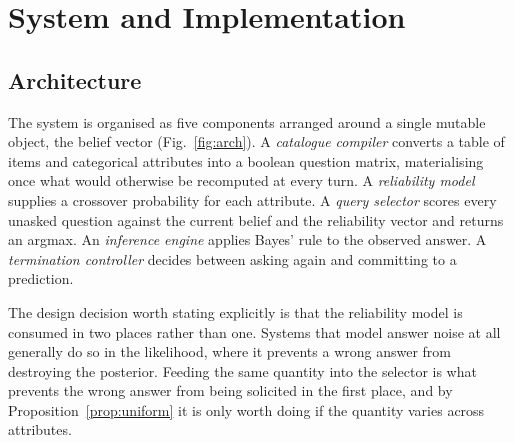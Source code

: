 \section{System and Implementation}
\label{sec:system}

\subsection{Architecture}

The system is organised as five components arranged around a single mutable
object, the belief vector (Fig.~\ref{fig:arch}). A \emph{catalogue compiler} converts a table of
items and categorical attributes into a boolean question matrix, materialising
once what would otherwise be recomputed at every turn. A \emph{reliability
model} supplies a crossover probability for each attribute. A \emph{query
selector} scores every unasked question against the current belief and the
reliability vector and returns an argmax. An \emph{inference engine} applies
Bayes' rule to the observed answer. A \emph{termination controller} decides
between asking again and committing to a prediction.

The design decision worth stating explicitly is that the reliability model is
consumed in two places rather than one. Systems that model answer noise at all
generally do so in the likelihood, where it prevents a wrong answer from
destroying the posterior. Feeding the same quantity into the selector is what
prevents the wrong answer from being solicited in the first place, and by
Proposition~\ref{prop:uniform} it is only worth doing if the quantity varies
across attributes.

